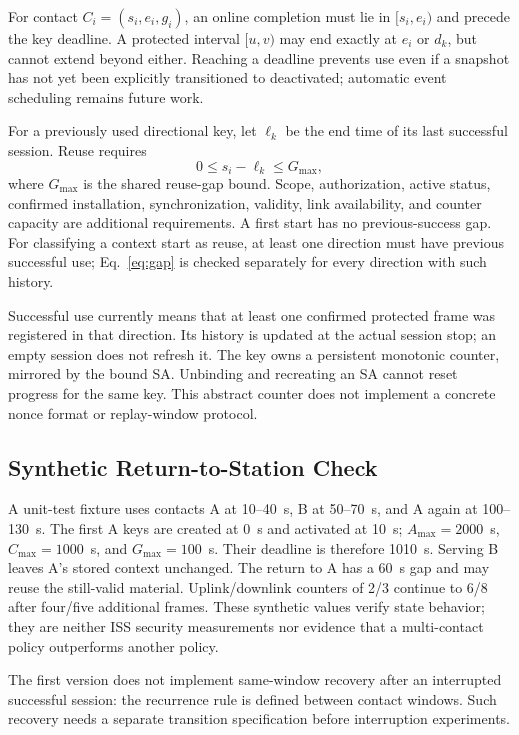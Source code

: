 \documentclass[conference]{IEEEtran}
\begin{document}
For contact $C_i=(s_i,e_i,g_i)$, an online completion must lie in $[s_i,e_i)$ and precede the key deadline. A protected interval $[u,v)$ may end exactly at $e_i$ or $d_k$, but cannot extend beyond either. Reaching a deadline prevents use even if a snapshot has not yet been explicitly transitioned to deactivated; automatic event scheduling remains future work.

For a previously used directional key, let $\ell_k$ be the end time of its last successful session. Reuse requires
\begin{equation}
0 \leq s_i-\ell_k \leq G_{\max},
\label{eq:gap}
\end{equation}
where $G_{\max}$ is the shared reuse-gap bound. Scope, authorization, active status, confirmed installation, synchronization, validity, link availability, and counter capacity are additional requirements. A first start has no previous-success gap. For classifying a context start as reuse, at least one direction must have previous successful use; Eq.~\eqref{eq:gap} is checked separately for every direction with such history.

Successful use currently means that at least one confirmed protected frame was registered in that direction. Its history is updated at the actual session stop; an empty session does not refresh it. The key owns a persistent monotonic counter, mirrored by the bound SA. Unbinding and recreating an SA cannot reset progress for the same key. This abstract counter does not implement a concrete nonce format or replay-window protocol.

\subsection{Synthetic Return-to-Station Check}
A unit-test fixture uses contacts A at 10--40~s, B at 50--70~s, and A again at 100--130~s. The first A keys are created at 0~s and activated at 10~s; $A_{\max}=2000$~s, $C_{\max}=1000$~s, and $G_{\max}=100$~s. Their deadline is therefore 1010~s. Serving B leaves A's stored context unchanged. The return to A has a 60~s gap and may reuse the still-valid material. Uplink/downlink counters of 2/3 continue to 6/8 after four/five additional frames. These synthetic values verify state behavior; they are neither ISS security measurements nor evidence that a multi-contact policy outperforms another policy.

The first version does not implement same-window recovery after an interrupted successful session: the recurrence rule is defined between contact windows. Such recovery needs a separate transition specification before interruption experiments.
\end{document}
